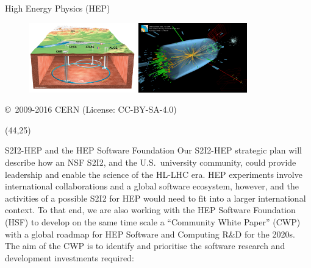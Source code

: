 \documentclass[final]{beamer}
\begin{document}
\begin{frame}{}
\begin{textblock}{38.0}
\begin{block}{High Energy Physics (HEP)}
\begin{figure}[tbph]
\centering
\includegraphics[width=0.41\textwidth]{images/CERN-LHC-cutaway-view-medium.png}
\includegraphics[width=0.42\textwidth]{images/eemm_run195099_evt137440354_ispy_3d-annotated-2.png}
\end{figure}
{\small \copyright~2009-2016 CERN (License: CC-BY-SA-4.0)}
\end{block}
\end{textblock}






\begin{textblock}{38.0}(44,25)
\begin{block}{S2I2-HEP and the HEP Software Foundation}
Our S2I2-HEP strategic plan will describe how an NSF S2I2, and the
U.S.\ university community, could provide leadership and enable the
science of the HL-LHC era.  HEP experiments involve international
collaborations and a global software ecosystem, however, and the
activities of a possible S2I2 for HEP would need to fit into a
larger international context. To that end, we are also working with
the HEP Software Foundation (HSF) to develop on the same time scale
a ``Community White Paper'' (CWP) with a global roadmap for HEP
Software and Computing R\&D for the 2020s. The aim of the CWP is
to identify and prioritise the software research and development
investments required:


\end{block}
\end{textblock}
\end{frame}
\end{document}
